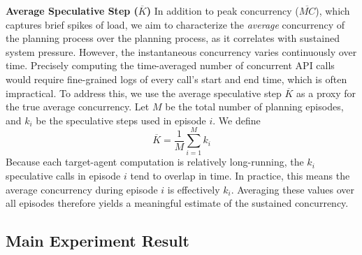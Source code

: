 \textbf{Average Speculative Step ($\overline{K}$)} In addition to peak concurrency ($\overline{MC}$), which captures brief spikes of load, we aim to characterize the \emph{average} concurrency of the planning process over the planning process, as it correlates with sustained system pressure. However, the instantaneous concurrency varies continuously over time. Precisely computing the time-averaged number of concurrent API calls would require fine-grained logs of every call’s start and end time, which is often impractical. To address this, we use the average speculative step $\overline{K}$ as a proxy for the true average concurrency. Let $M$ be the total number of planning episodes, and $k_i$ be the speculative steps used in episode $i$. We define
\begin{equation}
\overline{K} = \frac{1}{M} \sum_{i=1}^M {k}_i
\end{equation}
Because each target-agent computation is relatively long-running, the $k_i$ speculative calls in episode $i$ tend to overlap in time. In practice, this means the average concurrency during episode $i$ is effectively $k_i$. Averaging these values over all episodes therefore yields a meaningful estimate of the sustained concurrency.



\subsection{Main Experiment Result}

